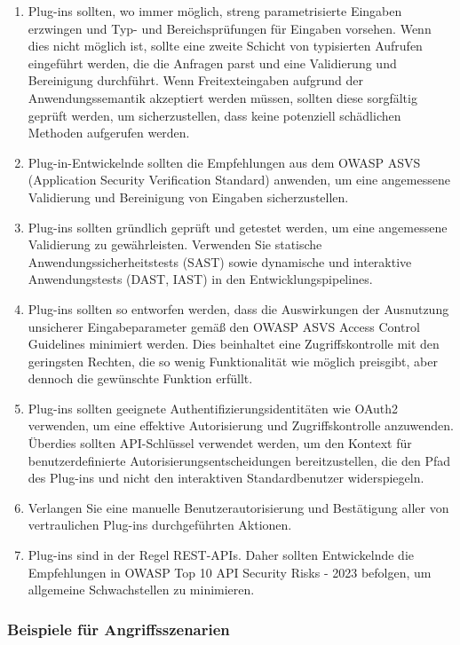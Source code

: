 \documentclass[
]{article}
\providecommand{\tightlist}{%
  \setlength{\itemsep}{0pt}\setlength{\parskip}{0pt}}
\begin{document}
\begin{enumerate}
\def\labelenumi{\arabic{enumi}.}
\tightlist
\item
  Plug-ins sollten, wo immer möglich, streng parametrisierte Eingaben
  erzwingen und Typ- und Bereichsprüfungen für Eingaben vorsehen. Wenn
  dies nicht möglich ist, sollte eine zweite Schicht von typisierten
  Aufrufen eingeführt werden, die die Anfragen parst und eine
  Validierung und Bereinigung durchführt. Wenn Freitexteingaben aufgrund
  der Anwendungssemantik akzeptiert werden müssen, sollten diese
  sorgfältig geprüft werden, um sicherzustellen, dass keine potenziell
  schädlichen Methoden aufgerufen werden.
\item
  Plug-in-Entwickelnde sollten die Empfehlungen aus dem OWASP ASVS
  (Application Security Verification Standard) anwenden, um eine
  angemessene Validierung und Bereinigung von Eingaben sicherzustellen.
\item
  Plug-ins sollten gründlich geprüft und getestet werden, um eine
  angemessene Validierung zu gewährleisten. Verwenden Sie statische
  Anwendungssicherheitstests (SAST) sowie dynamische und interaktive
  Anwendungstests (DAST, IAST) in den Entwicklungspipelines.
\item
  Plug-ins sollten so entworfen werden, dass die Auswirkungen der
  Ausnutzung unsicherer Eingabeparameter gemäß den OWASP ASVS Access
  Control Guidelines minimiert werden. Dies beinhaltet eine
  Zugriffskontrolle mit den geringsten Rechten, die so wenig
  Funktionalität wie möglich preisgibt, aber dennoch die gewünschte
  Funktion erfüllt.
\item
  Plug-ins sollten geeignete Authentifizierungsidentitäten wie OAuth2
  verwenden, um eine effektive Autorisierung und Zugriffskontrolle
  anzuwenden. Überdies sollten API-Schlüssel verwendet werden, um den
  Kontext für benutzerdefinierte Autorisierungsentscheidungen
  bereitzustellen, die den Pfad des Plug-ins und nicht den interaktiven
  Standardbenutzer widerspiegeln.
\item
  Verlangen Sie eine manuelle Benutzerautorisierung und Bestätigung
  aller von vertraulichen Plug-ins durchgeführten Aktionen.
\item
  Plug-ins sind in der Regel REST-APIs. Daher sollten Entwickelnde die
  Empfehlungen in OWASP Top 10 API Security Risks - 2023 befolgen, um
  allgemeine Schwachstellen zu minimieren.
\end{enumerate}

\subsubsection{Beispiele für
Angriffsszenarien}\label{beispiele-fuxfcr-angriffsszenarien}
\end{document}
